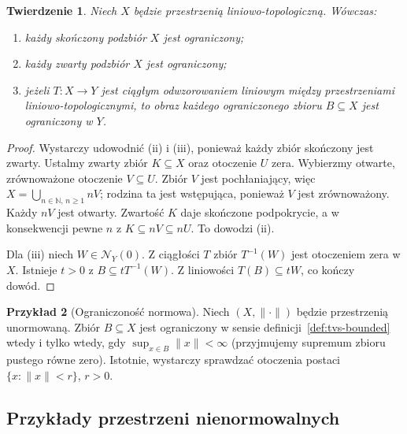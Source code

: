 \documentclass[11pt,a4paper]{article}
\numberwithin{equation}{section}
\theoremstyle{plain}
\newtheorem{twierdzenie}{Twierdzenie}[section]
\theoremstyle{definition}
\newtheorem{przyklad}[twierdzenie]{Przykład}
\theoremstyle{remark}
\newcommand{\N}{\mathbb N}
\begin{document}
\begin{twierdzenie}\label{thm:compact-bounded}
Niech $X$ będzie przestrzenią liniowo-topologiczną.
Wówczas:
\begin{enumerate}[label=\textup{(\roman*)}]
 \item każdy skończony podzbiór $X$ jest ograniczony;
 \item każdy zwarty podzbiór $X$ jest ograniczony;
 \item jeżeli $T\colon X\to Y$ jest ciągłym odwzorowaniem liniowym
       między przestrzeniami liniowo-topologicznymi, to obraz
       każdego ograniczonego zbioru $B\subseteq X$ jest ograniczony w $Y$.
\end{enumerate}
\end{twierdzenie}
\begin{proof}
Wystarczy udowodnić (ii) i (iii), ponieważ każdy zbiór
skończony jest zwarty. Ustalmy zwarty zbiór $K\subseteq X$
oraz otoczenie $U$ zera. Wybierzmy otwarte, zrównoważone
otoczenie $V\subseteq U$. Zbiór $V$ jest pochłaniający,
więc $X=\bigcup_{n\in\N,\,n\geq1}nV$; rodzina ta jest
wstępująca, ponieważ $V$ jest zrównoważony. Każdy $nV$
jest otwarty. Zwartość $K$ daje skończone podpokrycie,
a w konsekwencji pewne $n$ z $K\subseteq nV\subseteq nU$.
To dowodzi (ii).

Dla (iii) niech $W\in\mathcal N_Y(0)$.
Z ciągłości $T$ zbiór $T^{-1}(W)$ jest otoczeniem zera w $X$.
Istnieje $t>0$ z $B\subseteq tT^{-1}(W)$.
Z liniowości $T(B)\subseteq tW$, co kończy dowód.
\end{proof}

\begin{przyklad}[Ograniczoność normowa]
Niech $(X,\|\cdot\|)$ będzie przestrzenią unormowaną.
Zbiór $B\subseteq X$ jest ograniczony w sensie
definicji~\ref{def:tvs-bounded} wtedy i tylko wtedy, gdy
$\sup_{x\in B}\|x\|<\infty$ (przyjmujemy supremum zbioru
pustego równe zero). Istotnie, wystarczy sprawdzać
otoczenia postaci $\{x:\|x\|<r\}$, $r>0$.
\end{przyklad}

\subsection{Przykłady przestrzeni nienormowalnych}
\end{document}
